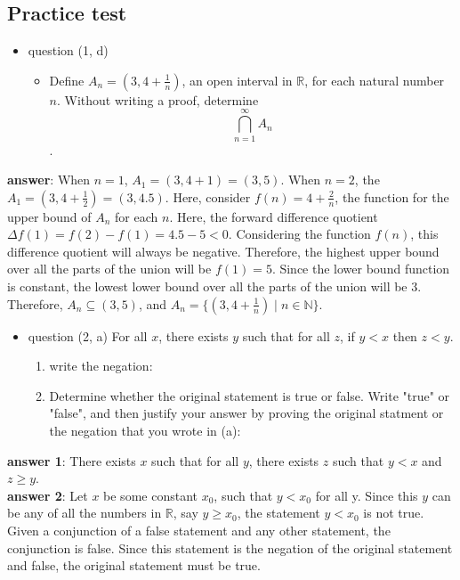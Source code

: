 \documentclass[12pt]{article}
\newcommand\Real{\mathbb{R}}
\newcommand\Natural{\mathbb{N}}
\newcommand\sube{\subseteq}
\begin{document}
\subsection{Practice test}
\label{sec:org8208308}
\begin{itemize}
\item question (1, d)
\begin{itemize}
\item Define \(A_{n}=(3,4+\frac{1}{n})\), an open interval in \(\Real\), for each natural
number \(n\). Without writing a proof, determine $$\bigcap\limits_{n=1}^{\infty}A_{n}$$.
\end{itemize}
\end{itemize}
\textbf{answer}: When \(n=1\), \(A_{1}=(3,4+1)=(3,5)\). When \(n=2\), the
\(A_{1}=(3,4+\frac{1}{2})=(3,4.5)\). Here, consider \(f(n)=4+\frac{2}{n}\), the
function for the upper bound of \(A_{n}\) for each \(n\). Here, the forward difference
quotient \(\Delta{}f(1)=f(2)-f(1)=4.5-5<0\). Considering the function \(f(n)\), this
difference quotient will always be negative. Therefore, the highest upper bound
over all the parts of the union will be \(f(1)=5\). Since the lower bound function
is constant, the lowest lower bound over all the parts of the union will be 3.
Therefore, \(A_{n}\sube{}(3,5)\), and \(A_{n}=\{(3,4+\frac{1}{n})\mid{}n\in{}\Natural\}\).

\begin{itemize}
\item question (2, a) For all \(x\), there exists \(y\) such that for all \(z\), if \(y<x\)
then \(z<y\).
\begin{enumerate}
\item write the negation:
\item Determine whether the original statement is true or false. Write "true" or
"false", and then justify your answer by proving the original statment or
the negation that you wrote in (a):
\end{enumerate}
\end{itemize}
\textbf{answer 1}: There exists \(x\) such that for all \(y\), there exists \(z\) such that
\(y<x\) and \(z\ge{}y\). \\
\textbf{answer 2}: Let \(x\) be some constant \(x_{0}\), such that \(y<x_{0}\) for all y. Since this
\(y\) can be any of all the numbers in \(\Real\), say \(y\ge{}x_{0}\), the statement \(y<x_{0}\)
is not true. Given a conjunction of a false statement and any other statement,
the conjunction is false. Since this statement is the negation of the original
statement and false, the original statement must be true. \\
\end{document}
